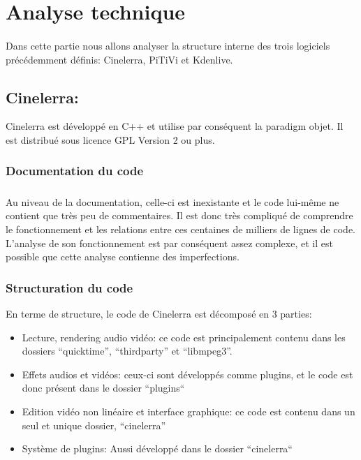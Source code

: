 \newpage \section{Analyse technique}

\paragraph {}

Dans cette partie nous allons analyser la structure interne des trois
logiciels précédemment définis: Cinelerra, PiTiVi et Kdenlive.

\subsection{Cinelerra:}

Cinelerra est développé en C++ et utilise par conséquent la paradigm
objet.  Il est distribué sous licence GPL Version 2 ou plus.

\subsubsection{Documentation du code}

\subparagraph{}

Au niveau de la documentation, celle-ci est inexistante et le code
lui-même ne contient que très peu de commentaires. Il est donc très
compliqué de comprendre le fonctionnement et les relations entre ces
centaines de milliers de lignes de code. L'analyse de son fonctionnement
est par conséquent assez complexe, et il est possible que cette analyse
contienne des imperfections.

\subsubsection {Structuration du code}

En terme de structure, le code de Cinelerra est décomposé en 3 parties:

\begin{itemize}

  \item{Lecture, rendering  audio vidéo: ce code est principalement
    contenu dans les dossiers ``quicktime'', ``thirdparty'' et
    ``libmpeg3''.}

  \item{Effets audios et vidéos: ceux-ci sont développés comme plugins,
    et le code est donc présent dans le dossier ``plugins`` }

  \item{Edition vidéo non linéaire et interface graphique: ce code est
    contenu dans un seul et unique dossier, ``cinelerra''}

  \item{Système de plugins: Aussi développé dans le dossier
  ``cinelerra``}

\end{itemize}


